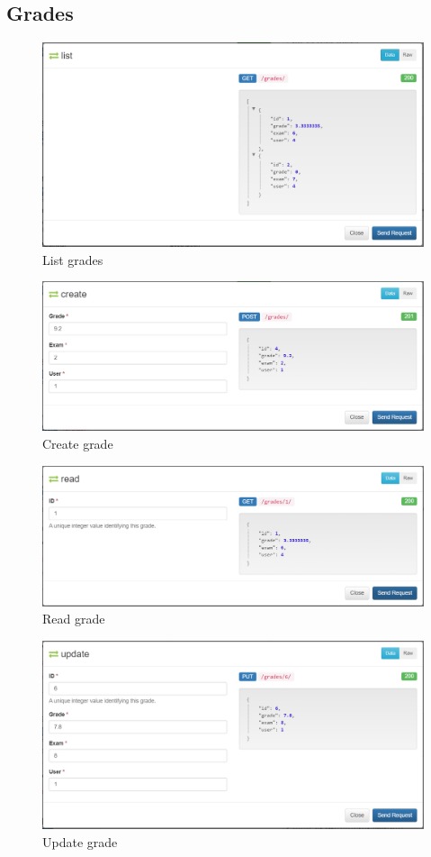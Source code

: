 \documentclass[11pt]{article}
\begin{document}
\newpage
\subsection{Grades}
\label{sec:org0bbbe02}
\begin{figure}[h!]
\centering
\includegraphics[width=.9\linewidth]{img/list_grades.png}
\caption{List grades}
\end{figure}
\begin{figure}[htbp]
\centering
\includegraphics[width=.9\linewidth]{img/create_grades.png}
\caption{Create grade}
\end{figure}
\begin{figure}[htbp]
\centering
\includegraphics[width=.9\linewidth]{img/get_grades_by_id.png}
\caption{Read grade}
\end{figure}
\begin{figure}[htbp]
\centering
\includegraphics[width=.9\linewidth]{img/update_grade.png}
\caption{Update grade}
\end{figure}
\end{document}
